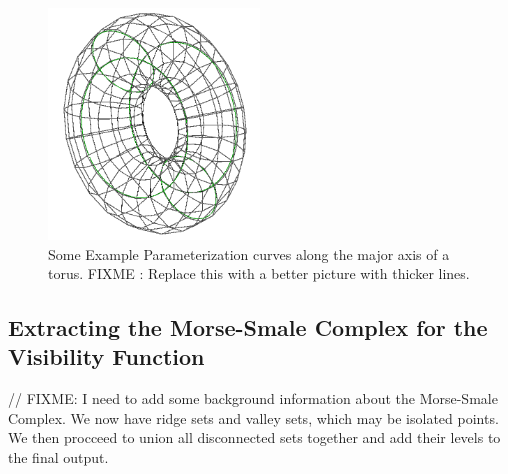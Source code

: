 \documentclass[12pt, letterpaper]{article}
\begin{document}
		\begin{figure}[h]
		\centering
		\includegraphics[width=0.5\textwidth]{Parameter_aligned_curves}
		\caption{Some Example Parameterization curves along the major axis of a torus. FIXME : Replace this with a better picture with thicker lines.}
		\label{fig:parameter_aligned_curves_torus}
		\end{figure}

	\subsection{Extracting the Morse-Smale Complex for the Visibility Function}
	
		// FIXME: I need to add some background information about the Morse-Smale Complex.
	We now have ridge sets and valley sets, which may be isolated points. We then procceed to union all disconnected sets together and add their levels to the final output.
		
\end{document}
